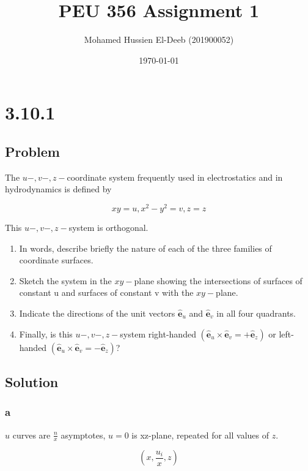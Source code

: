 \documentclass[12pt]{article}
\title{PEU 356 Assignment 1}
\author{Mohamed Hussien El-Deeb (201900052)}
\date{\today}
\begin{document}
\maketitle
\tableofcontents

\section{3.10.1}

\subsection{Problem}

The \(u-, v-, z-\)coordinate system frequently used in electrostatics and in hydrodynamics
is defined by

\[
    xy = u, x^2 - y^2 = v, z = z
\]

This \(u-, v-, z-\)system is orthogonal.
\bigskip

\begin{enumerate}[label= \textbf{(\alph*)}]
    \item In words, describe briefly the nature of each of the three families of coordinate
          surfaces.
    \item Sketch the system in the \(x y-\)plane showing the intersections of surfaces of constant
          u and surfaces of constant v with the \(x y-\)plane.
    \item Indicate the directions of the unit vectors \(\hat{\textbf{e}}_u\) and \(\hat{\textbf{e}}_v\)
          in all four quadrants.
    \item Finally, is this \(u-, v-, z-\)system right-handed \((\hat{\textbf{e}}_u \times \hat{\textbf{e}}_v
          = +\hat{\textbf{e}}_z )\) or left-handed \((\hat{\textbf{e}}_u \times
          \hat{\textbf{e}}_v = -\hat{\textbf{e}}_z )\)?
\end{enumerate}

\subsection{Solution}

\subsubsection{a}

\(u\) curves are \(\frac{n}{x}\) asymptotes, \(u=0\) is xz-plane, repeated for all values of \(z\).

\[
    (x, \frac{u_i}{x}, z)
\]
\end{document}
